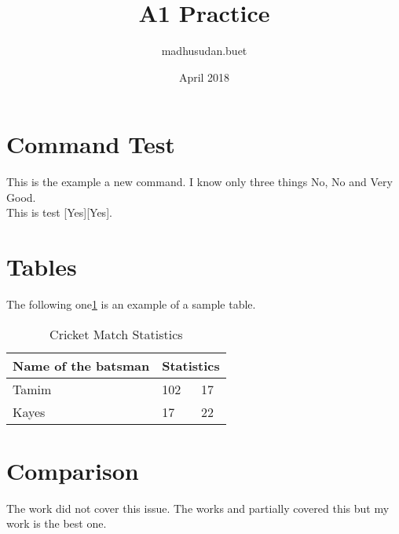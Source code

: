 \documentclass{article}
\title{A1 Practice}
\author{madhusudan.buet }
\date{April 2018}
\newcommand{\something}[3][Yes]{only three things #1, #2 and #3}
\begin{document}
\maketitle
\section{Command Test}
This is the example a new command. I know \something[No]{No}{Very Good}.\\
This is test [Yes][Yes].
\section{Tables}
The following one\ref{tab:1} is an example of a sample table.
\begin{table}[h!]
\centering
\begin{tabular}{| >{\raggedright}m{2cm} | m{2cm} | m{2cm} |}
\hline
Name of the batsman & \multicolumn{2}{c|}{Statistics}\\
\hline
Tamim & 102 & 17 \\ 
\hline
Kayes & 17 & 22\\
\hline
\end{tabular}
\caption{Cricket Match Statistics}
\label{tab:1}
\end{table}


\section{Comparison}
The work \cite{Wang:2004} did not cover this issue. The works \cite{Pei:2004} and \cite{Han:2000} partially covered this but my work is the best one.

\printbibliography[]
%
%
\end{document}
